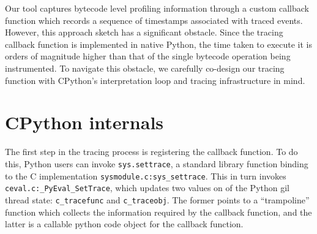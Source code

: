 Our tool captures bytecode level profiling information through a custom callback function which records a sequence of timestamps associated with traced events.
However, this approach sketch has a significant obstacle. Since the tracing callback function is implemented in native Python, the time taken to execute it is orders of magnitude higher than that of the single bytecode operation being instrumented.
To navigate this obstacle, we carefully co-design our tracing function with CPython's interpretation loop and tracing infrastructure in mind.

\section{CPython internals}
\label{sec:profiling-bytecode-cpython-internals}




The first step in the tracing process is registering the callback function.
To do this, Python users can invoke \texttt{sys.settrace}, a standard library function binding to the C implementation \texttt{sysmodule.c:sys\_settrace}. This in turn invokes \texttt{ceval.c:\_PyEval\_SetTrace}, which updates two values on of the Python \ac{gil} thread state: \texttt{c\_tracefunc} and \texttt{c\_traceobj}. The former points to a ``trampoline'' function which collects the information required by the callback function, and the latter is a callable python code object for the callback function.






